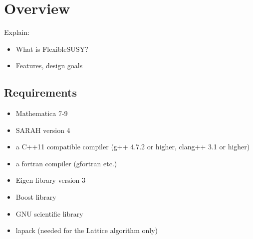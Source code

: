 \section{Overview}

Explain:
\begin{itemize}
\item What is FlexibleSUSY?
\item Features, design goals
\end{itemize}

\subsection{Requirements}

\begin{itemize}
\item Mathematica 7-9
\item SARAH version 4
\item a C++11 compatible compiler (g++ 4.7.2 or higher, clang++ 3.1 or
  higher)
\item a fortran compiler (gfortran etc.)
\item Eigen library version 3
\item Boost library
\item GNU scientific library
\item lapack (needed for the Lattice algorithm only)
\end{itemize}
